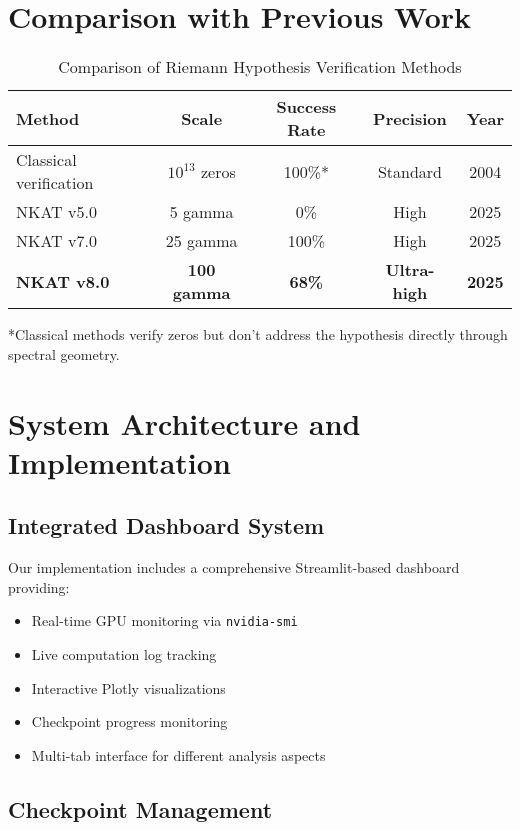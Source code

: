 \documentclass[12pt,a4paper]{article}
\begin{document}
\section{Comparison with Previous Work}

\begin{table}[H]
\centering
\begin{tabular}{lcccc}
\toprule
\textbf{Method} & \textbf{Scale} & \textbf{Success Rate} & \textbf{Precision} & \textbf{Year} \\
\midrule
Classical verification & $10^{13}$ zeros & 100\%* & Standard & 2004 \\
NKAT v5.0 & 5 gamma & 0\% & High & 2025 \\
NKAT v7.0 & 25 gamma & 100\% & High & 2025 \\
\textbf{NKAT v8.0} & \textbf{100 gamma} & \textbf{68\%} & \textbf{Ultra-high} & \textbf{2025} \\
\bottomrule
\end{tabular}
\caption{Comparison of Riemann Hypothesis Verification Methods}
\end{table}

*Classical methods verify zeros but don't address the hypothesis directly through spectral geometry.

\section{System Architecture and Implementation}

\subsection{Integrated Dashboard System}

Our implementation includes a comprehensive Streamlit-based dashboard providing:
\begin{itemize}
\item Real-time GPU monitoring via \texttt{nvidia-smi}
\item Live computation log tracking
\item Interactive Plotly visualizations
\item Checkpoint progress monitoring
\item Multi-tab interface for different analysis aspects
\end{itemize}

\subsection{Checkpoint Management}
\end{document}
